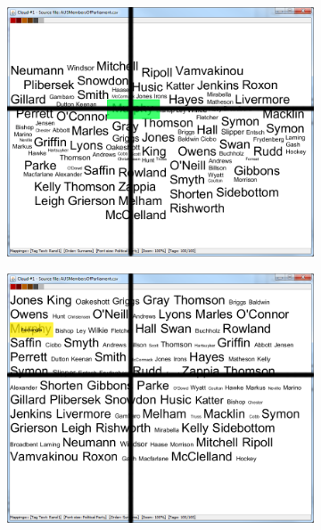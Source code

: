 \begin{figure}[!htb]
\centering
\begin{subfigure}{.5\textwidth}
  \centering
  \includegraphics[scale=0.25]{Experiment2/T1/M1Spiral.png}
\end{subfigure}%
\begin{subfigure}{.5\textwidth}
  \centering
  \includegraphics[scale=0.25]{Experiment2/T1/M1Typewriter.png}
\end{subfigure}
\begin{subfigure}{.5\textwidth}
  \centering

\end{subfigure}
\end{figure}
